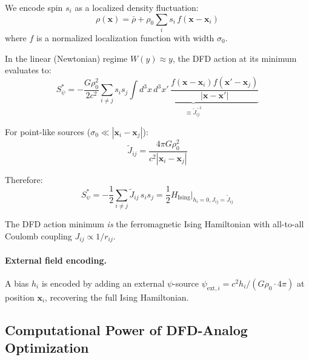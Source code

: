 \documentclass[11pt]{article}
\theoremstyle{definition}
\theoremstyle{remark}
\begin{document}
We encode spin $s_i$ as a localized density fluctuation:
\begin{equation}
\rho(\mathbf{x}) = \bar\rho + \rho_0\sum_i s_i\,f(\mathbf{x} - \mathbf{x}_i)
\label{eq:ising_source}
\end{equation}
where $f$ is a normalized localization function with width $\sigma_0$.

In the linear (Newtonian) regime $W(y) \approx y$, the DFD action at
its minimum evaluates to:
\begin{equation}
S_\psi^* = -\frac{G\rho_0^2}{2c^2}\sum_{i \neq j} s_i s_j
\underbrace{\int d^3x\,d^3x'\,\frac{f(\mathbf{x}-\mathbf{x}_i)
f(\mathbf{x}'-\mathbf{x}_j)}{|\mathbf{x}-\mathbf{x}'|}}_{\equiv \tilde{J}_{ij}^{-1}}
\end{equation}

For point-like sources ($\sigma_0 \ll |\mathbf{x}_i - \mathbf{x}_j|$):
\begin{equation}
\tilde{J}_{ij} = \frac{4\pi G\rho_0^2}{c^2 |\mathbf{x}_i - \mathbf{x}_j|}
\label{eq:J_tilde}
\end{equation}

Therefore:
\begin{equation}
\boxed{
S_\psi^* = -\frac{1}{2}\sum_{i\neq j} \tilde{J}_{ij}\,s_i s_j
= \frac{1}{2}H_{\mathrm{Ising}}\bigg|_{h_i = 0, J_{ij} = \tilde{J}_{ij}}
}
\label{eq:action_ising}
\end{equation}

The DFD action minimum \emph{is} the ferromagnetic Ising Hamiltonian
with all-to-all Coulomb coupling $J_{ij} \propto 1/r_{ij}$.

\paragraph{External field encoding.}
A bias $h_i$ is encoded by adding an external $\psi$-source
$\psi_{\mathrm{ext},i} = c^2 h_i / (G\rho_0 \cdot 4\pi)$ at
position $\mathbf{x}_i$, recovering the full Ising Hamiltonian.

\subsection{Computational Power of DFD-Analog Optimization}
\label{sec:complexity}
\end{document}
